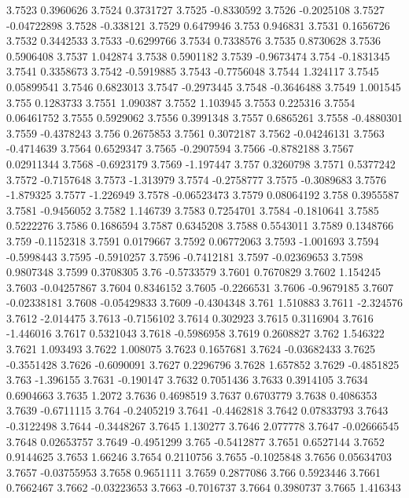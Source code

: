 3.7523  0.3960626
3.7524  0.3731727
3.7525  -0.8330592
3.7526  -0.2025108
3.7527  -0.04722898
3.7528  -0.338121
3.7529  0.6479946
3.753  0.946831
3.7531  0.1656726
3.7532  0.3442533
3.7533  -0.6299766
3.7534  0.7338576
3.7535  0.8730628
3.7536  0.5906408
3.7537  1.042874
3.7538  0.5901182
3.7539  -0.9673474
3.754  -0.1831345
3.7541  0.3358673
3.7542  -0.5919885
3.7543  -0.7756048
3.7544  1.324117
3.7545  0.05899541
3.7546  0.6823013
3.7547  -0.2973445
3.7548  -0.3646488
3.7549  1.001545
3.755  0.1283733
3.7551  1.090387
3.7552  1.103945
3.7553  0.225316
3.7554  0.06461752
3.7555  0.5929062
3.7556  0.3991348
3.7557  0.6865261
3.7558  -0.4880301
3.7559  -0.4378243
3.756  0.2675853
3.7561  0.3072187
3.7562  -0.04246131
3.7563  -0.4714639
3.7564  0.6529347
3.7565  -0.2907594
3.7566  -0.8782188
3.7567  0.02911344
3.7568  -0.6923179
3.7569  -1.197447
3.757  0.3260798
3.7571  0.5377242
3.7572  -0.7157648
3.7573  -1.313979
3.7574  -0.2758777
3.7575  -0.3089683
3.7576  -1.879325
3.7577  -1.226949
3.7578  -0.06523473
3.7579  0.08064192
3.758  0.3955587
3.7581  -0.9456052
3.7582  1.146739
3.7583  0.7254701
3.7584  -0.1810641
3.7585  0.5222276
3.7586  0.1686594
3.7587  0.6345208
3.7588  0.5543011
3.7589  0.1348766
3.759  -0.1152318
3.7591  0.0179667
3.7592  0.06772063
3.7593  -1.001693
3.7594  -0.5998443
3.7595  -0.5910257
3.7596  -0.7412181
3.7597  -0.02369653
3.7598  0.9807348
3.7599  0.3708305
3.76  -0.5733579
3.7601  0.7670829
3.7602  1.154245
3.7603  -0.04257867
3.7604  0.8346152
3.7605  -0.2266531
3.7606  -0.9679185
3.7607  -0.02338181
3.7608  -0.05429833
3.7609  -0.4304348
3.761  1.510883
3.7611  -2.324576
3.7612  -2.014475
3.7613  -0.7156102
3.7614  0.302923
3.7615  0.3116904
3.7616  -1.446016
3.7617  0.5321043
3.7618  -0.5986958
3.7619  0.2608827
3.762  1.546322
3.7621  1.093493
3.7622  1.008075
3.7623  0.1657681
3.7624  -0.03682433
3.7625  -0.3551428
3.7626  -0.6090091
3.7627  0.2296796
3.7628  1.657852
3.7629  -0.4851825
3.763  -1.396155
3.7631  -0.190147
3.7632  0.7051436
3.7633  0.3914105
3.7634  0.6904663
3.7635  1.2072
3.7636  0.4698519
3.7637  0.6703779
3.7638  0.4086353
3.7639  -0.6711115
3.764  -0.2405219
3.7641  -0.4462818
3.7642  0.07833793
3.7643  -0.3122498
3.7644  -0.3448267
3.7645  1.130277
3.7646  2.077778
3.7647  -0.02666545
3.7648  0.02653757
3.7649  -0.4951299
3.765  -0.5412877
3.7651  0.6527144
3.7652  0.9144625
3.7653  1.66246
3.7654  0.2110756
3.7655  -0.1025848
3.7656  0.05634703
3.7657  -0.03755953
3.7658  0.9651111
3.7659  0.2877086
3.766  0.5923446
3.7661  0.7662467
3.7662  -0.03223653
3.7663  -0.7016737
3.7664  0.3980737
3.7665  1.416343
